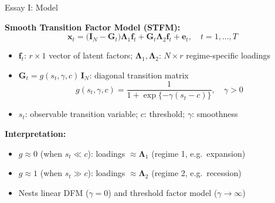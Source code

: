 \documentclass{beamer}
\begin{document}
\begin{frame}{Essay I: Model}

\textbf{Smooth Transition Factor Model (STFM):}
\[
\boldsymbol{x}_t = \bigl(\boldsymbol{I}_{N}-\boldsymbol{G}_{t}\bigr)\boldsymbol{\Lambda}_1\boldsymbol{f}_t
  + \boldsymbol{G}_{t}\boldsymbol{\Lambda}_2\boldsymbol{f}_t + \boldsymbol{e}_t, \quad t=1,\ldots,T
\]

\begin{itemize}
  \item $\boldsymbol{f}_t$: $r \times 1$ vector of latent factors; \;$\boldsymbol{\Lambda}_1,\boldsymbol{\Lambda}_2$: $N\times r$ regime-specific loadings
  \item $\boldsymbol{G}_t = g(s_t,\gamma,c)\,\boldsymbol{I}_N$: diagonal transition matrix
  \[
  g(s_t,\gamma,c) = \frac{1}{1+\exp\{-\gamma(s_t-c)\}}, \quad \gamma>0
  \]
  \item $s_t$: observable transition variable; $c$: threshold; $\gamma$: smoothness
\end{itemize}

\vspace{0.4em}
\textbf{Interpretation:}
\begin{itemize}
  \item $g\approx 0$ (when $s_t \ll c$): loadings $\approx\boldsymbol{\Lambda}_1$ \quad (regime 1, e.g.\ expansion)
  \item $g\approx 1$ (when $s_t \gg c$): loadings $\approx\boldsymbol{\Lambda}_2$ \quad (regime 2, e.g.\ recession)
  \item Nests linear DFM ($\gamma=0$) and threshold factor model ($\gamma\to\infty$)
\end{itemize}

\end{frame}
\end{document}
